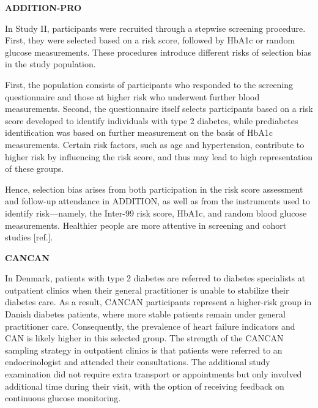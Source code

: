 \documentclass[
  a4paper,
  headsepline=true,
  open=any]{scrbook}
\begin{document}
\textbf{ADDITION-PRO}

In Study II, participants were recruited through a stepwise screening
procedure. First, they were selected based on a risk score, followed by
HbA1c or random glucose measurements. These procedures introduce
different risks of selection bias in the study population.

First, the population consists of participants who responded to the
screening questionnaire and those at higher risk who underwent further
blood measurements. Second, the questionnaire itself selects
participants based on a risk score developed to identify individuals
with type 2 diabetes, while prediabetes identification was based on
further measurement on the basis of HbA1c measurements. Certain risk
factors, such as age and hypertension, contribute to higher risk by
influencing the risk score, and thus may lead to high representation of
these groups.

Hence, selection bias arises from both participation in the risk score
assessment and follow-up attendance in ADDITION, as well as from the
instruments used to identify risk---namely, the Inter-99 risk score,
HbA1c, and random blood glucose measurements. Healthier people are more
attentive in screening and cohort studies {[}ref.{]}.

\textbf{CANCAN}

In Denmark, patients with type 2 diabetes are referred to diabetes
specialists at outpatient clinics when their general practitioner is
unable to stabilize their diabetes care. As a result, CANCAN
participants represent a higher-risk group in Danish diabetes patients,
where more stable patients remain under general practitioner care.
Consequently, the prevalence of heart failure indicators and CAN is
likely higher in this selected group. The strength of the CANCAN
sampling strategy in outpatient clinics is that patients were referred
to an endocrinologist and attended their consultations. The additional
study examination did not require extra transport or appointments but
only involved additional time during their visit, with the option of
receiving feedback on continuous glucose monitoring.
\end{document}
